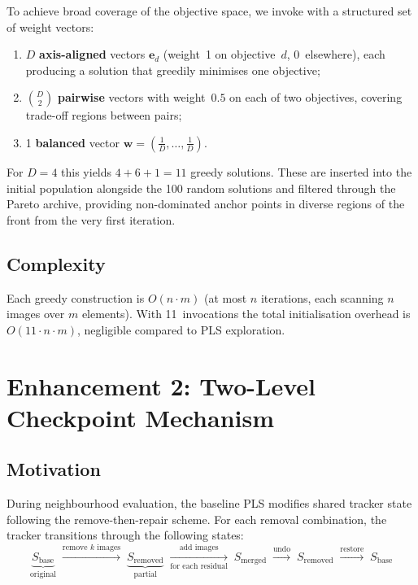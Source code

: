 \documentclass[11pt,a4paper]{article}
\begin{document}
To achieve broad coverage of the objective space, we invoke
 with a structured set of weight vectors:

\begin{enumerate}[nosep]
  \item $D$ \textbf{axis-aligned} vectors $\mathbf{e}_d$ (weight~1 on
    objective~$d$, 0~elsewhere), each producing a solution that greedily
    minimises one objective;
  \item $\binom{D}{2}$ \textbf{pairwise} vectors with weight~$0.5$ on
    each of two objectives, covering trade-off regions between pairs;
  \item 1 \textbf{balanced} vector $\mathbf{w} = (\tfrac{1}{D},\ldots,
    \tfrac{1}{D})$.
\end{enumerate}

For $D{=}4$ this yields $4 + 6 + 1 = 11$ greedy solutions.  These are
inserted into the initial population alongside the 100 random solutions
and filtered through the Pareto archive, providing non-dominated anchor
points in diverse regions of the front from the very first iteration.

\subsection{Complexity}

Each greedy construction is $O(n \cdot m)$ (at most $n$ iterations, each
scanning $n$ images over $m$ elements).  With 11~invocations the total
initialisation overhead is $O(11 \cdot n \cdot m)$, negligible compared
to PLS exploration.

\section{Enhancement 2: Two-Level Checkpoint Mechanism}
\label{sec:checkpoint}

\subsection{Motivation}

During neighbourhood evaluation, the baseline PLS modifies shared
tracker state following the remove-then-repair scheme.  For each removal
combination, the tracker transitions through the following states:
\[
  \underbrace{S_{\mathrm{base}}}_{\text{original}}
  \;\xrightarrow{\text{remove } k \text{ images}}\;
  \underbrace{S_{\mathrm{removed}}}_{\text{partial}}
  \;\xrightarrow[\text{for each residual}]{\text{add images}}\;
  S_{\mathrm{merged}}
  \;\xrightarrow{\text{undo}}\;
  S_{\mathrm{removed}}
  \;\xrightarrow{\text{restore}}\;
  S_{\mathrm{base}}
\]
\end{document}
